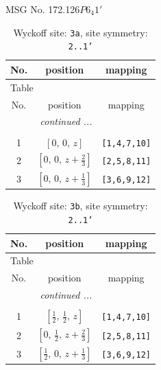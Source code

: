 \documentclass[fleqn,8pt]{jsarticle}
\begin{document}
\setcounter{MaxMatrixCols}{32}

\renewcommand{\tablename}{Table~}
\renewcommand{\figurename}{Figure~}
\begin{center}
\LARGE
MSG No. 172.126\quad$P6_{4}1'$
\end{center}
\renewcommand{\arraystretch}{1.2}
\begin{longtable}{ccc}
\caption{Wyckoff site: {\tt 3a}, site symmetry: {\tt 2..1'}}
 \\
 \hline \hline
No. & position & mapping \\ \hline \endfirsthead

\multicolumn{2}{l}{\tablename\ \thetable{}} \\
 \hline \hline
No. & position & mapping \\ \hline \endhead

 \hline \hline
\multicolumn{2}{r}{\footnotesize\it continued ...} \\ \endfoot

 \hline \hline
\multicolumn{2}{r}{} \\ \endlastfoot

1 & $\left[ 0,\, 0,\, z \right]$ & {\tt [1,4,7,10]} \\ \hline
2 & $\left[ 0,\, 0,\, z + \frac{2}{3} \right]$ & {\tt [2,5,8,11]} \\ \hline
3 & $\left[ 0,\, 0,\, z + \frac{1}{3} \right]$ & {\tt [3,6,9,12]} \\
\end{longtable}
\renewcommand{\arraystretch}{1.2}
\begin{longtable}{ccc}
\caption{Wyckoff site: {\tt 3b}, site symmetry: {\tt 2..1'}}
 \\
 \hline \hline
No. & position & mapping \\ \hline \endfirsthead

\multicolumn{2}{l}{\tablename\ \thetable{}} \\
 \hline \hline
No. & position & mapping \\ \hline \endhead

 \hline \hline
\multicolumn{2}{r}{\footnotesize\it continued ...} \\ \endfoot

 \hline \hline
\multicolumn{2}{r}{} \\ \endlastfoot

1 & $\left[ \frac{1}{2},\, \frac{1}{2},\, z \right]$ & {\tt [1,4,7,10]} \\ \hline
2 & $\left[ 0,\, \frac{1}{2},\, z + \frac{2}{3} \right]$ & {\tt [2,5,8,11]} \\ \hline
3 & $\left[ \frac{1}{2},\, 0,\, z + \frac{1}{3} \right]$ & {\tt [3,6,9,12]} \\
\end{longtable}
\end{document}
